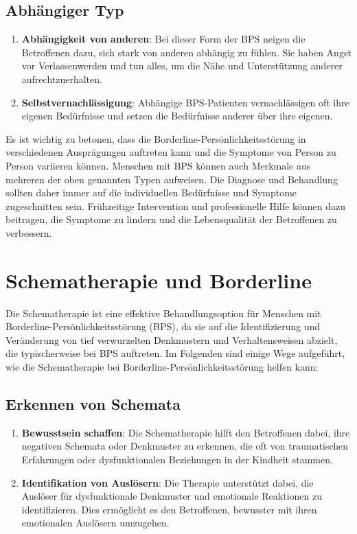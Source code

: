 \subsection{Abhängiger Typ}

\begin{enumerate}
\item \textbf{Abhängigkeit von anderen}: Bei dieser Form der BPS neigen die Betroffenen dazu, sich stark von anderen abhängig zu fühlen. Sie haben Angst vor Verlassenwerden und tun alles, um die Nähe und Unterstützung anderer aufrechtzuerhalten.

\item \textbf{Selbstvernachlässigung}: Abhängige BPS-Patienten vernachlässigen oft ihre eigenen Bedürfnisse und setzen die Bedürfnisse anderer über ihre eigenen.
\end{enumerate}
%
Es ist wichtig zu betonen, dass die Borderline-Persönlichkeitsstörung in verschiedenen Ausprägungen auftreten kann und die Symptome von Person zu Person variieren können. Menschen mit BPS können auch Merkmale aus mehreren der oben genannten Typen aufweisen. Die Diagnose und Behandlung sollten daher immer auf die individuellen Bedürfnisse und Symptome zugeschnitten sein. Frühzeitige Intervention und professionelle Hilfe können dazu beitragen, die Symptome zu lindern und die Lebensqualität der Betroffenen zu verbessern.
\section{Schematherapie und Borderline}

Die Schematherapie ist eine effektive Behandlungsoption für Menschen mit Borderline-Persönlichkeitsstörung (BPS), da sie auf die Identifizierung und Veränderung von tief verwurzelten Denkmustern und Verhaltensweisen abzielt, die typischerweise bei BPS auftreten. Im Folgenden sind einige Wege aufgeführt, wie die Schematherapie bei Borderline-Persönlichkeitsstörung helfen kann:

\subsection{Erkennen von Schemata}

\begin{enumerate}
\item \textbf{Bewusstsein schaffen}: Die Schematherapie hilft den Betroffenen dabei, ihre negativen Schemata oder Denkmuster zu erkennen, die oft von traumatischen Erfahrungen oder dysfunktionalen Beziehungen in der Kindheit stammen.

\item \textbf{Identifikation von Auslösern}: Die Therapie unterstützt dabei, die Auslöser für dysfunktionale Denkmuster und emotionale Reaktionen zu identifizieren. Dies ermöglicht es den Betroffenen, bewusster mit ihren emotionalen Auslösern umzugehen.
\end{enumerate}

